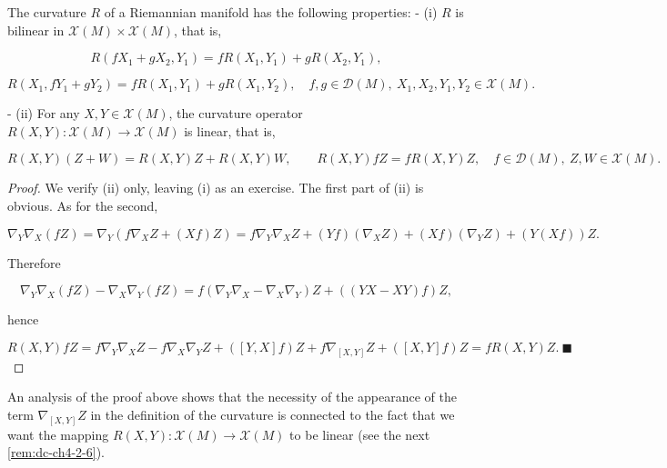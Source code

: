 \begin{proposition}
  \label{prop:dc-ch4-2-2}
  \leanok
  The curvature $R$ of a Riemannian manifold has the following properties:
  - (i) $R$ is bilinear in $\mathcal{X}(M)\times\mathcal{X}(M)$, that is,
  
  $$
  R(fX_1+gX_2,Y_1)=fR(X_1,Y_1)+gR(X_2,Y_1),
  $$
  
  $$
  R(X_1,fY_1+gY_2)=fR(X_1,Y_1)+gR(X_1,Y_2),\quad f,g\in\mathcal{D}(M),\ X_1,X_2,Y_1,Y_2\in\mathcal{X}(M).
  $$
  
  - (ii) For any $X,Y\in\mathcal{X}(M)$, the curvature operator
  $R(X,Y):\mathcal{X}(M)\to\mathcal{X}(M)$ is linear, that is,
  
  $$
  R(X,Y)(Z+W)=R(X,Y)Z+R(X,Y)W,\qquad R(X,Y)fZ=fR(X,Y)Z,\quad f\in\mathcal{D}(M),\ Z,W\in\mathcal{X}(M).
  $$
\end{proposition}
\begin{proof}
  \leanok
  We verify (ii) only, leaving (i) as an exercise. The first part of (ii)
  is obvious. As for the second,
  
  $$
  \nabla_Y\nabla_X(fZ)=\nabla_Y(f\nabla_X Z+(Xf)Z)=f\nabla_Y\nabla_X Z+(Yf)(\nabla_X Z)+(Xf)(\nabla_Y Z)+(Y(Xf))Z.
  $$
  
  Therefore
  
  $$
  \nabla_Y\nabla_X(fZ)-\nabla_X\nabla_Y(fZ)=f(\nabla_Y\nabla_X-\nabla_X\nabla_Y)Z+((YX-XY)f)Z,
  $$
  
  hence
  
  $$
  R(X,Y)fZ=f\nabla_Y\nabla_X Z-f\nabla_X\nabla_Y Z+([Y,X]f)Z+f\nabla_{[X,Y]}Z+([X,Y]f)Z=fR(X,Y)Z.\ \blacksquare
  $$
\end{proof}

\begin{remark}[Remark 2.3]
  \label{rem:dc-ch4-2-3}
  An analysis of the proof above shows that the necessity of the appearance of the
  term $\nabla_{[X,Y]}Z$ in the definition of the curvature is connected to the fact
  that we want the mapping $R(X,Y):\mathcal{X}(M)\to\mathcal{X}(M)$ to be linear
  (see the next \cref{rem:dc-ch4-2-6}).
\end{remark}

